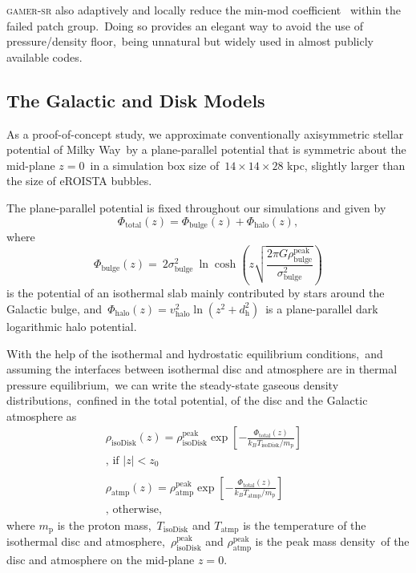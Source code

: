 \documentclass[twocolumn]{aastex631}
\begin{document}
  \textsc{gamer-sr} also adaptively and locally reduce the min-mod coefficient\
  \citep{tseng2021} within the failed patch group.\
  Doing so provides an elegant way to avoid the use of pressure/density floor,\
  being unnatural but widely used in almost publicly available codes.\

  \subsection{The Galactic and Disk Models}
  As a proof-of-concept study, we approximate conventionally axisymmetric stellar potential of Milky Way\
  by a plane-parallel potential that is symmetric about the mid-plane $z=0$\
  in a simulation box size of\
  $14\times14\times28$ kpc, slightly larger than the size of eROISTA bubbles.

  The plane-parallel potential is fixed throughout our simulations and given by
  \begin{equation}
    \Phi_{\text{total}}(z) = \Phi_{\text{bulge}}(z) + \Phi_{\text{halo}}(z),
  \end{equation}
  where
  \begin{equation}
    \Phi_{\text{bulge}}(z)=\
    2\sigma^2_{\text{bulge}}\
    \ln\cosh\left(z\sqrt{\frac{2\pi G\rho_{\text{bulge}}^{\text{peak}}}{\sigma^2_{\text{bulge}}}}\right)
  \end{equation}
  is the potential of an isothermal slab mainly contributed by stars around the Galactic bulge, and\
  $\Phi_{\text{halo}}(z)=v^2_{\text{halo}}\ln\left(z^2+d^2_{\text{h}}\right)$\
  is a plane-parallel dark logarithmic halo potential.

  With the help of the isothermal and hydrostatic equilibrium conditions,\
  and assuming the interfaces between isothermal disc and atmosphere are in thermal pressure equilibrium,\
  we can write the steady-state gaseous density distributions,\
  confined in the total potential, of the disc and the Galactic atmosphere as\
  \begin{subequations}
  \begin{align}
     \displaystyle \rho_{\text{isoDisk}}(z) = \rho_{\text{isoDisk}}^{\text{peak}}
     \exp\left[-\frac{\Phi_{\text{total}}(z)}{k_{B}T_{\text{isoDisk}}/m_{\text{p}}}\right]&\label{isothermal-disc-density}\\
     \text{, if $|z| < z_{0}$}& \nonumber \\
     \nonumber\\
     \displaystyle \rho_{\text{atmp}}(z) = \rho_{\text{atmp}}^{\text{peak}}
     \exp\left[-\frac{\Phi_{\text{total}}(z)}{k_{B}T_{\text{atmp}}/m_{\text{p}}}\right]&\label{isothermal-atmp-density}\\
     \text{, otherwise,}& \nonumber
  \end{align}
  \label{disc-atm-sys}
  \end{subequations}
  where $m_{\text{p}}$ is the proton mass,\
  $T_{\text{isoDisk}}$ and $T_{\text{atmp}}$ is the temperature of the isothermal disc and atmosphere,\
  $\rho_{\text{isoDisk}}^{\text{peak}}$ and $\rho_{\text{atmp}}^{\text{peak}}$ is the peak mass density\
  of the disc and atmosphere on the mid-plane $z=0$.
\end{document}
